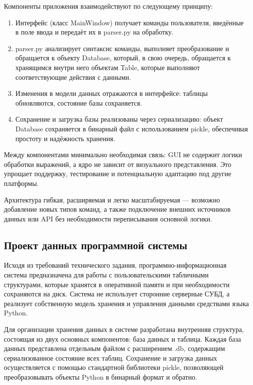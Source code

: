 Компоненты приложения взаимодействуют по следующему принципу:
\begin{enumerate}
	\item Интерфейс (класс MainWindow) получает команды пользователя, введённые в поле ввода и передаёт их в parser.py на обработку.
	\item parser.py анализирует синтаксис команды, выполняет преобразование и обращается к объекту Database, который, в свою очередь, обращается к хранящимся внутри него объектам Table, которые выполняют соответствующие действия с данными.
	\item Изменения в модели данных отражаются в интерфейсе: таблицы обновляются, состояние базы сохраняется.
	\item Сохранение и загрузка базы реализованы через сериализацию: объект Database сохраняется в бинарный файл с использованием pickle, обеспечивая простоту и надёжность хранения.
\end{enumerate}

Между компонентами минимально необходимая связь: GUI не содержит логики обработки выражений, а ядро не зависит от визуального представления. Это упрощает поддержку, тестирование и потенциальную адаптацию под другие платформы.

Архитектура гибкая, расширяемая и легко масштабируемая — возможно добавление новых типов команд, а также подключение внешних источников данных или API без необходимости переписывания основной логики.

\subsection{Проект данных программной системы}

Исходя из требований технического задания, программно-информационная система предназначена для работы с пользовательскими табличными структурами, которые хранятся в оперативной памяти и при необходимости сохраняются на диск. Система не использует сторонние серверные СУБД, а реализует собственную модель хранения и управления данными средствами языка Python.

Для организации хранения данных в системе разработана внутренняя структура, состоящая из двух основных компонентов: база данных и таблица. Каждая база данных представлена отдельным файлом с расширением .db, содержащим сериализованное состояние всех таблиц. Сохранение и загрузка данных осуществляется с помощью стандартной библиотеки pickle, позволяющей преобразовывать объекты Python в бинарный формат и обратно.

